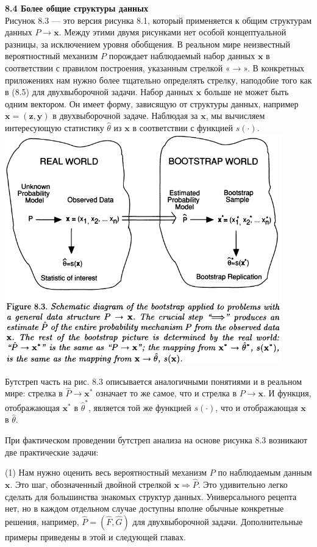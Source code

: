 \documentclass{report}
\begin{document}
\textbf{8.4 Более общие структуры данных}\\
Рисунок 8.3 --- это версия рисунка 8.1, который применяется к общим структурам данных $P \to \textbf{x}$. Между этими двумя рисунками нет особой концептуальной разницы, за исключением уровня обобщения. В реальном мире неизвестный вероятностный механизм $P$ порождает наблюдаемый набор данных $\textbf{x}$ в соответствии с правилом построения, указанным стрелкой «$\to$». В конкретных приложениях нам нужно более тщательно определять стрелку, наподобие того как в (8.5) для двухвыборочной задачи. Набор данных $\textbf{x}$ больше не может быть одним вектором. Он имеет форму, зависящую от структуры данных, например $\textbf{x} = (\textbf{z}, \textbf{y})$ в двухвыборочной задаче. Наблюдая за $\textbf{x}$, мы вычисляем интересующую статистику $\hat{\theta}$ из $\textbf{x}$ в соответствии с функцией $s(\cdot)$.\\
\includegraphics[width=12cm]{fig83}

Бутстреп часть на рис. 8.3 описывается аналогичными понятиями и в реальном мире: стрелка в $\hat{P} \to \textbf{x}^*$ означает то же самое, что и стрелка в $P \to \textbf{x}$. И функция, отображающая $\textbf{x}^*$ в $\hat{\theta}^*$, является той же функцией $s(\cdot)$, что и отображающая $\textbf{x}$ в $\hat{\theta}$. 

При фактическом проведении бутстреп анализа на основе рисунка 8.3 возникают две практические задачи:

(1) Нам нужно оценить весь вероятностный механизм $P$ по наблюдаемым данным $\textbf{x}$. Это шаг, обозначенный двойной стрелкой $\textbf{x} \Rightarrow \hat{P}$. Это удивительно легко сделать для большинства знакомых структур данных. Универсального рецепта нет, но в каждом отдельном случае доступны вполне обычные конкретные решения, например, $\hat{P} = (\hat{F}, \hat{G})$ для двухвыборочной задачи. Дополнительные примеры приведены в этой и следующей главах.
\end{document}

